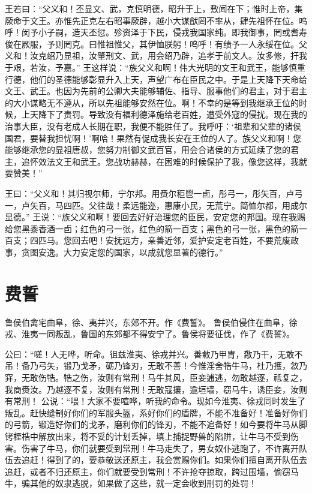 \documentclass[a4paper,12pt,UTF8,twoside]{ctexbook}
\begin{document}
王若曰：“父义和！丕显文、武，克慎明德，昭升于上，敷闻在下；惟时上帝，集厥命于文王。亦惟先正克左右昭事厥辟，越小大谋猷罔不率从，肆先祖怀在位。呜呼！闵予小子嗣，造天丕愆。殄资泽于下民，侵戎我国家纯。即我御事，罔或耆寿俊在厥服，予则罔克。曰惟祖惟父，其伊恤朕躬！呜呼！有绩予一人永绥在位。父义和！汝克绍乃显祖，汝肇刑文、武，用会绍乃辟，追孝于前文人。汝多修，扞我于艰，若汝，予嘉。”
王这样说：“族父义和啊！伟大光明的文王和武王，能够慎重行德，他们的圣德能够彰显升入上天，声望广布在臣民之中。于是上天降下天命给文王、武王。也因为先前的公卿大夫能够辅佐、指导、服事他们的君主，对于君主的大小谋略无不遵从，所以先祖能够安然在位。啊！不幸的是等到我继承王位的时候，上天降下了责罚。导致没有福利德泽施给老百姓，遭受外寇的侵扰。现在我的治事大臣，没有老成人长期在职，我便不能胜任了。我呼吁：‘祖辈和父辈的诸侯国君，要替我担忧啊！’啊哈！果然有促成我长安在王位的人了。族父义和啊！您能够继承您的显祖唐叔，您努力制御文武百官，用会合诸侯的方式延续了您的君主，追怀效法文王和武王。您战功赫赫，在困难的时候保护了我，像您这样，我就要赞美！”

王曰：“父义和！其归视尔师，宁尔邦。用赉尔秬鬯一卣，彤弓一，彤矢百，卢弓一，卢矢百，马四匹。父往哉！柔远能迩，惠康小民，无荒宁。简恤尔都，用成尔显德。”
王说：“族父义和啊！要回去好好治理您的臣民，安定您的邦国。现在我赐给您黑黍香酒一卣；红色的弓一张，红色的箭一百支；黑色的弓一张，黑色的箭一百支；四匹马。您回去吧！安抚远方，亲善近邻，爱护安定老百姓，不要荒废政事，贪图安逸。大力安定您的国家，以成就您显著的德行。”

\chapter{费誓}

鲁侯伯禽宅曲阜，徐、夷并兴，东郊不开。作《费誓》。
鲁侯伯侵住在曲阜，徐戎、淮夷一同叛乱，鲁国的东郊都不得安宁了。鲁侯将要征伐，作了《费誓》。

公曰：“嗟！人无哗，听命。徂兹淮夷、徐戎并兴。善敹乃甲胄，敿乃干，无敢不吊！备乃弓矢，锻乃戈矛，砺乃锋刃，无敢不善！今惟淫舍牿牛马，杜乃擭，敜乃穽，无敢伤牿。牿之伤，汝则有常刑！马牛其风，臣妾逋逃，勿敢越逐，祗复之，我商赉汝。乃越逐不复，汝则有常刑！无敢寇攘，逾垣墙，窃马牛，诱臣妾，汝则有常刑！
公说：“喂！大家不要喧哗，听我的命令。现如今淮夷、徐戎同时发生了叛乱。赶快缝制好你们的军服头盔，系好你们的盾牌，不能不准备好！准备好你们的弓箭，锻造好你们的戈矛，磨利你们的锋刃，不能不追备好！如今要将牛马从脚铐桎梏中解放出来，将不妥的计划丢掉，填上捕捉野兽的陷阱，让牛马不受到伤害。伤害了牛马，你们就要受到常刑！牛马走失了，男女奴仆逃跑了，不许离开队伍去追赶！得到了的，要恭敬送还原主，我会赏赐你们。如果你们擅自离开队伍去追赶，或者不归还原主，你们就要受到常刑！不许抢夺掠取，跨过围墙，偷窃马牛，骗其他的奴隶逃脱，如果做了这些，就一定会收到刑罚的处罚！
\end{document}
